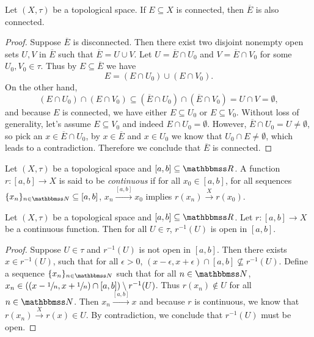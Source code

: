 \documentclass[screen,single]{techreport}
\numberwithin{equation}{section}
\begin{document}
\begin{proposition}\label{Prop:ClosureOfConnStillConn}
	Let $(X,\tau)$ be a topological space.
	If $E \subseteq X$ is connected, then $\overline{E}$ is also connected.
\end{proposition}
\begin{proof}
	Suppose $\overline{E}$ is disconnected.
	Then there exist two disjoint nonempty open sets $U,V$ in $\overline{E}$ such that $\overline{E} = U \cup V$.
	Let $U = \overline{E} \cap U_0$ and $V = \overline{E}\cap V_0$ for some $U_0,V_0 \in \tau$.
	Thus by $E \subseteq \overline{E}$ we have
	\[
	E = (E \cap U_0) \cup (E \cap V_0).
	\]
	On the other hand,
	\[
	(E \cap U_0) \cap (E \cap V_0) \subseteq (\overline{E} \cap U_0) \cap (\overline{E} \cap V_0) = U \cap V = \emptyset,
	\]
	and because $E$ is connected, we have either $E \subseteq U_0$ or $E \subseteq V_0$.
	Without loss of generality, let's assume $E \subseteq V_0$ and indeed $E \cap U_0 = \emptyset$.
	However, $\overline{E} \cap U_0 = U \neq \emptyset$, so pick an $x \in \overline{E} \cap U_0$, by $x \in \overline{E}$ and $x \in U_0$ we know that $U_0 \cap E \neq \emptyset$, which leads to a contradiction.
	Therefore we conclude that $\overline{E}$ is connected.
\end{proof}

\begin{definition}\label{De:ContinuousFromInterval}
	Let $(X,\tau)$ be a topological space and $[a,b] \subseteq \bbR$.
	A function $r : [a,b] \to X$ is said to be \emph{continuous} if for all $x_0 \in [a,b]$, for all sequences $\{x_n\}_{n \in \bbN} \subseteq [a,b]$, $x_n \xrightarrow{[a,b]} x_0$ implies $r(x_n) \xrightarrow{X} r(x_0)$.
\end{definition}

\begin{lemma}\label{Lem:ContinuousReverseOpenIsOpen}
	Let $(X,\tau)$ be a topological space and $[a,b] \subseteq \bbR$.
	Let $r : [a,b] \to X$ be a continuous function.
	Then for all $U \in \tau$, $r^{-1}(U)$ is open in $[a,b]$.
\end{lemma}
\begin{proof}
	Suppose $U \in \tau$ and $r^{-1}(U)$ is not open in $[a,b]$.
	Then there exists $x \in r^{-1}(U)$, such that for all $\epsilon > 0$, $(x-\epsilon,x+\epsilon) \cap [a,b] \not\subseteq r^{-1}(U)$.
	Define a sequence $\{x_n\}_{n \in \bbN}$ such that for all $n \in \bbN$, $x_n \in ((x-\sfrac{1}{n},x+\sfrac{1}{n}) \cap [a,b]) \setminus r^{-1}(U)$.
	Thus $r(x_n) \not\in U$ for all $n \in \bbN$.
	Then $x_n \xrightarrow{[a,b]} x$ and because $r$ is continuous, we know that $r(x_n) \xrightarrow{X} r(x) \in U$.
	By contradiction, we conclude that $r^{-1}(U)$ must be open.
\end{proof}
\end{document}
